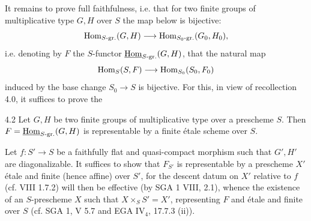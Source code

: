 It remains to prove full faithfulness, i.e. that for two finite groups of multiplicative type $G,H$ over $S$ the map below is bijective:
\[
\operatorname{Hom}_{S\text{-}\mathrm{gr.}}(G,H)\longrightarrow\operatorname{Hom}_{S_0\text{-}\mathrm{gr.}}(G_0,H_0),
\]
 i.e. denoting by $F$ the $S$-functor $\underline{\operatorname{Hom}}_{S\text{-}\mathrm{gr.}}(G,H)$, that the natural map
\[
\operatorname{Hom}_S(S,F)\longrightarrow\operatorname{Hom}_{S_0}(S_0,F_0)
\]
induced by the base change $S_0\to S$ is bijective. For this, in view of recollection 4.0, it suffices to prove the
\begin{lemma}{4.2}\label{X.4.2}
Let $G,H$ be two finite groups of multiplicative type over a prescheme $S$. Then $F=\underline{\operatorname{Hom}}_{S\text{-}\mathrm{gr.}}(G,H)$ is representable by a finite étale scheme over $S$.
\end{lemma}
 Let $f:S'\to S$ be a faithfully flat and quasi-compact morphism such that $G',H'$ are diagonalizable. It suffices to show that $F_{S'}$ is representable by a prescheme $X'$ étale and finite (hence affine) over $S'$, for the descent datum on $X'$ relative to $f$ (cf. VIII 1.7.2) will then be effective (by SGA 1 VIII, 2.1), whence the existence of an $S$-prescheme $X$ such that $X\times_S S'=X'$, representing $F$ and étale and finite over $S$ (cf. SGA 1, V 5.7 and EGA IV$_4$, 17.7.3 (ii)).

